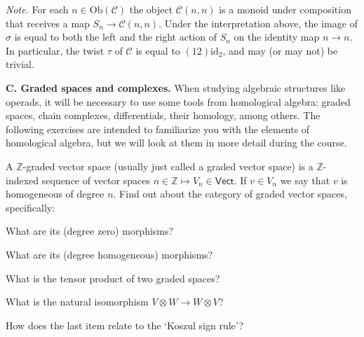 \emph{Note.} For each $n\in\mathrm{Ob}(\mathcal C)$ the
object $\mathcal{C}(n,n)$ is a monoid under composition
that receives a map $S_n\longrightarrow \mathcal{C}(n,n)$.
Under the interpretation above, the image of $\sigma$
is equal to both the left and the right action of $S_n$ 
on the identity map $n\to n$. In particular, the twist
$\tau$ of $\mathcal{C}$ is equal to $(12)\mathrm{id}_2$,
and may (or may not) be trivial.
  
\medskip
  
\textbf{C. Graded spaces and complexes.} When studying
algebraic structures like operads, it will be necessary
to use some tools from homological algebra: graded spaces,
chain complexes, differentials, their homology, among
others. The following exercises are intended to familiarize
you with the elements of homological algebra, but we will
look at them in more detail during the course.

\begin{question} A $\mathbb Z$-graded vector space (usually 
just called a graded vector space) is a $\mathbb Z$-indexed 
sequence of vector spaces $n \in \mathbb Z \longmapsto V_n \in
\mathsf{Vect}$. If $v\in V_n$ we say that $v$ is homogeneous of
degree $n$. Find out about the category of graded vector spaces, 
specifically:

\begin{titemize}
\item What are its (degree zero) morphisms?
\item What are its (degree homogeneous) morphisms?
\item What is the tensor product of two graded spaces?
\item What is the natural isomorphism $V\otimes W\longrightarrow W\otimes V$?
\item How does the last item relate to the `Koszul sign
rule'?
\end{titemize}
\end{question}

